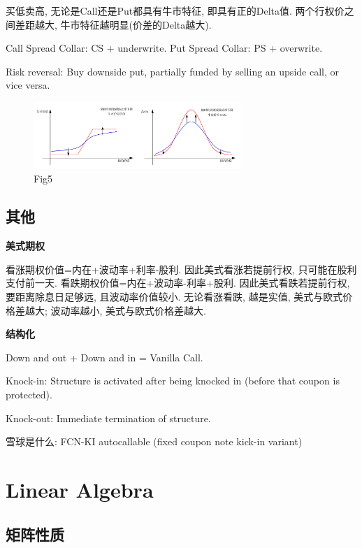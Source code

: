 \documentclass[UTF8]{ctexart}
\begin{document}
买低卖高, 无论是Call还是Put都具有牛市特征, 即具有正的Delta值. 
两个行权价之间差距越大, 牛市特征越明显(价差的Delta越大).

Call Spread Collar: CS + underwrite.
Put Spread Collar: PS + overwrite.

Risk reversal: Buy downside put, partially funded by selling an upside call, or vice versa.

\begin{figure}[H]
    \centering
    \includegraphics[width=0.7\textwidth]{fig/fig6.png}
    \caption{Fig5}
\end{figure}


\subsection{其他}
\noindent \textbf{美式期权} \par
看涨期权价值=内在+波动率+利率-股利. 因此美式看涨若提前行权, 只可能在股利支付前一天.
看跌期权价值=内在+波动率-利率+股利. 因此美式看跌若提前行权, 要距离除息日足够远, 且波动率价值较小.
无论看涨看跌, 越是实值, 美式与欧式价格差越大; 波动率越小, 美式与欧式价格差越大.


\noindent \textbf{结构化} \par
Down and out + Down and in = Vanilla Call.

Knock-in: Structure is activated after being knocked in (before that coupon is protected).

Knock-out: Immediate termination of structure.

雪球是什么: FCN-KI autocallable (fixed coupon note kick-in variant)


\section{Linear Algebra}

\subsection{矩阵性质}
\end{document}
